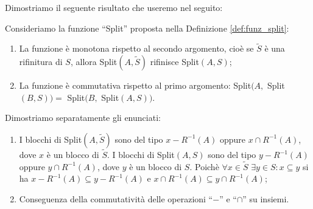 Dimostriamo il seguente risultato che useremo nel seguito:
\begin{theorem}
    \label{theo:split_properties}
    Consideriamo la funzione ``Split'' proposta nella Definizione \ref{def:funz_split}:
    \begin{enumerate}
        \item La funzione è monotona rispetto al secondo argomento, cioè se $\widetilde{S}$ è una rifinitura di $S$, allora Split$(A,\widetilde{S})$ rifinisce Split$(A,S)$;
        \item La funzione è commutativa rispetto al primo argomento: Split$(A,$ Split$(B,S)) =$ Split$(B,$ Split$(A,S))$.
    \end{enumerate}
\end{theorem}
\begin{proof2}
    Dimostriamo separatamente gli enunciati:
    \begin{enumerate}
        \item I blocchi di Split$(A,\widetilde{S})$ sono del tipo $x - R^{-1}(A)$ oppure $x \cap R^{-1}(A)$, dove $x$ è un blocco di $\widetilde{S}$. I blocchi di Split$(A,S)$ sono del tipo $y - R^{-1}(A)$ oppure $y \cap R^{-1}(A)$, dove $y$ è un blocco di $S$. Poichè $\forall x \in \widetilde{S} \,\,\exists y \in S : x \subseteq y$ si ha $x - R^{-1}(A) \subseteq y - R^{-1}(A)$ e $x \cap R^{-1}(A) \subseteq y \cap R^{-1}(A)$;
        \item Conseguenza della commutatività delle operazioni ``$-$'' e ``$\cap$'' su insiemi.
    \end{enumerate}
\end{proof2}

